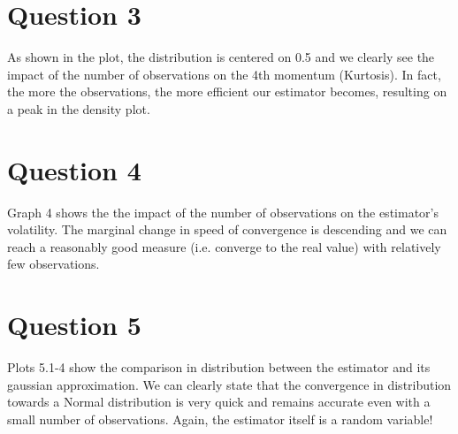 \section{Question 3}
As shown in the plot, the distribution is centered on 0.5 and we clearly see the impact of the number of observations on the 4th momentum (Kurtosis). In fact, the more the observations, the more efficient our estimator becomes, resulting on a peak in the density plot.
\section{Question 4}
Graph 4 shows the the impact of the number of observations on the estimator's volatility. The marginal change in speed of convergence is descending and we can reach a reasonably good measure (i.e. converge to the real value) with relatively few observations.
\section{Question 5}
Plots 5.1-4 show the comparison in distribution between the estimator and its gaussian approximation. We can clearly state that the convergence in distribution towards a Normal distribution is very quick and remains accurate even with a small number of observations. Again, the estimator itself is a random variable!